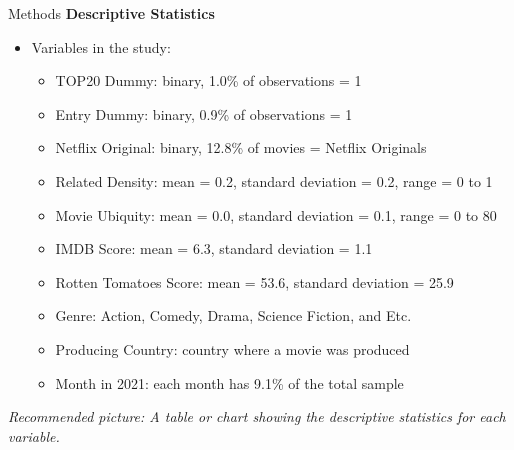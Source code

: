 \documentclass[
  ignorenonframetext,
]{beamer}
\begin{document}
\begin{frame}{Methods}
\protect\hypertarget{methods-2}{}
\textbf{Descriptive Statistics}

\begin{itemize}
\item
  Variables in the study:

  \begin{itemize}
  \item
    TOP20 Dummy: binary, 1.0\% of observations = 1
  \item
    Entry Dummy: binary, 0.9\% of observations = 1
  \item
    Netflix Original: binary, 12.8\% of movies = Netflix Originals
  \item
    Related Density: mean = 0.2, standard deviation = 0.2, range = 0 to
    1
  \item
    Movie Ubiquity: mean = 0.0, standard deviation = 0.1, range = 0 to
    80
  \item
    IMDB Score: mean = 6.3, standard deviation = 1.1
  \item
    Rotten Tomatoes Score: mean = 53.6, standard deviation = 25.9
  \item
    Genre: Action, Comedy, Drama, Science Fiction, and Etc.
  \item
    Producing Country: country where a movie was produced
  \item
    Month in 2021: each month has 9.1\% of the total sample
  \end{itemize}
\end{itemize}

\emph{Recommended picture: A table or chart showing the descriptive
statistics for each variable.}
\end{frame}
\end{document}
